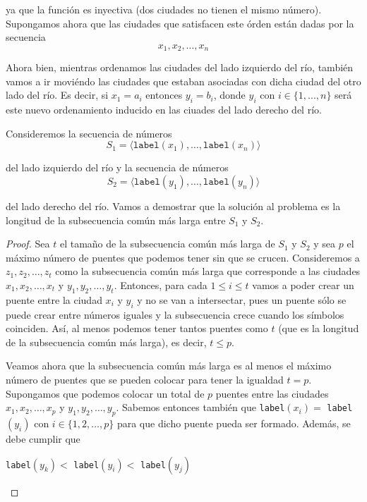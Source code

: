 \documentclass[letterpaper,11pt]{article}
\begin{document}
\begin{enumerate}
    ya que la función es inyectiva (dos ciudades no tienen el mismo número).
    Supongamos ahora que las ciudades que satisfacen este órden están dadas por 
    la secuencia 
    \begin{equation*}
        x_1, x_2, \ldots, x_n
    \end{equation*}

    Ahora bien, mientras ordenamos las ciudades del lado izquierdo del río, 
    también vamos a ir moviéndo las ciudades que estaban asociadas con dicha 
    ciudad del otro lado del río. Es decir, si $x_1 = a_i$ entonces $y_i = b_i$, 
    donde $y_i$ con $i \in \{1, ..., n\}$ será este nuevo ordenamiento inducido 
    en las ciuades del lado derecho del río. 

    Consideremos la secuencia de números
    \begin{equation*}
        S_1 = \langle \texttt{label}(x_1), \ldots, \texttt{label}(x_n) \rangle
    \end{equation*}
    
    del lado izquierdo del río y la secuencia de números 
    \begin{equation*}
        S_2 = \langle \texttt{label}(y_1), \ldots, \texttt{label}(y_n) \rangle
    \end{equation*}

    del lado derecho del río. Vamos a demostrar que la solución al problema es 
    la longitud de la subsecuencia común más larga entre $S_1$ y $S_2$.

    \begin{proof}
        Sea $t$ el tamaño de la subsecuencia común más larga de $S_1$ y $S_2$
        y sea $p$ el máximo número de puentes que podemos tener sin que se 
        crucen. Consideremos a $z_1, z_2, \ldots, z_t$ como la subsecuencia
        común más larga que corresponde a las ciudades $x_1, x_2, \ldots, x_t$ 
        y $y_1, y_2, \ldots, y_t$. Entonces, para cada $1 \leq i \leq t$
        vamos a poder crear un puente entre la ciudad $x_i$ y $y_i$ y no se 
        van a intersectar, pues un puente sólo se puede crear entre números 
        iguales y la subsecuencia crece cuando los símbolos coinciden. Así, 
        al menos podemos tener tantos puentes como $t$ (que es la longitud 
        de la subsecuencia común más larga), es decir, $t \leq p$.

        Veamos ahora que la subsecuencia común más larga es al menos el máximo 
        número de puentes que se pueden colocar para tener la igualdad $t = p$.
        Supongamos que podemos colocar un total de $p$ puentes entre las 
        ciudades $x_1, x_2, \ldots, x_p$ y $y_1, y_2, \ldots, y_p$. Sabemos 
        entonces también que \texttt{label}$(x_i) = $ \texttt{label}$(y_i)$ 
        con $i \in \{1, 2, \ldots, p\}$ para que dicho puente pueda ser 
        formado. Además, se debe cumplir que
        \begin{center}
            \texttt{label}$(y_k) < $ \texttt{label}$(y_i) < $ 
            \texttt{label}$(y_j)$
        \end{center} 
        

\end{proof}
\end{enumerate}
\end{document}
